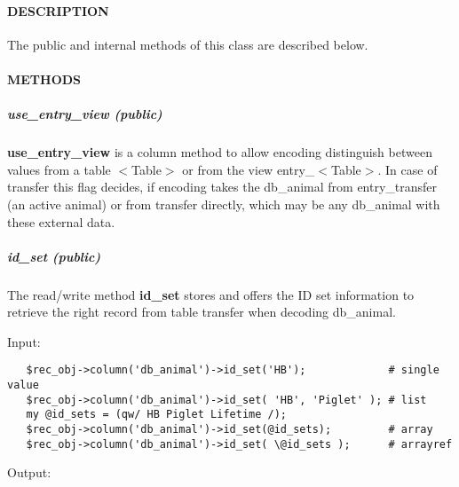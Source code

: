 \paragraph*{DESCRIPTION\label{Apiis::DataBase::Record::Column_--_package_for_DataBase_Record_columns_DESCRIPTION}}


The public and internal methods of this class are described below.

\paragraph*{METHODS\label{Apiis::DataBase::Record::Column_--_package_for_DataBase_Record_columns_METHODS}}
\subparagraph*{use\_entry\_view (public)\label{Apiis::DataBase::Record::Column_--_package_for_DataBase_Record_columns_use_entry_view_public_}}


\textbf{use\_entry\_view} is a column method to allow encoding distinguish between
values from a table $<$Table$>$ or from the view entry\_$<$Table$>$. In case of
transfer this flag decides, if encoding takes the db\_animal from
entry\_transfer (an active animal) or from transfer directly, which may be any
db\_animal with these external data.

\subparagraph*{id\_set (public)\label{Apiis::DataBase::Record::Column_--_package_for_DataBase_Record_columns_id_set_public_}}


The read/write method \textbf{id\_set} stores and offers the ID set information to
retrieve the right record from table transfer when decoding db\_animal.



Input:

\begin{verbatim}
   $rec_obj->column('db_animal')->id_set('HB');             # single value
   $rec_obj->column('db_animal')->id_set( 'HB', 'Piglet' ); # list
   my @id_sets = (qw/ HB Piglet Lifetime /);
   $rec_obj->column('db_animal')->id_set(@id_sets);         # array
   $rec_obj->column('db_animal')->id_set( \@id_sets );      # arrayref
\end{verbatim}


Output:

